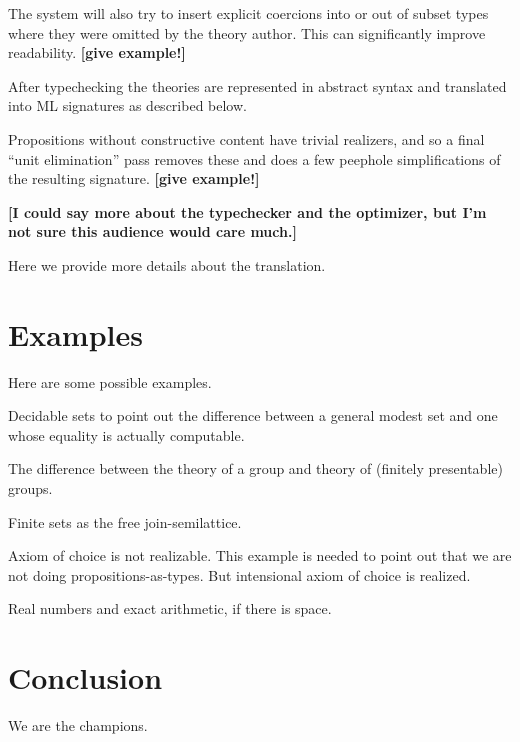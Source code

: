 \documentclass{article}
\newcommand{\comment}[1]{\textbf{[#1]}}
\begin{document}
The system will also try to insert explicit coercions into or out of
subset types where they were omitted by the theory author.  This can
significantly improve readability.  \comment{give example!}

After typechecking the theories are represented in abstract syntax and
translated into ML signatures as described below.  

Propositions without constructive content have trivial realizers, and
so a final ``unit elimination'' pass removes these and does a few
peephole simplifications of the resulting signature. \comment{give example!}

\comment{I could say more about the typechecker and the optimizer, but
  I'm not sure this audience would care much.}

Here we provide more details about the translation.


\section{Examples}
\label{sec:examples}

Here are some possible examples.

Decidable sets to point out the difference between a general modest
set and one whose equality is actually computable.

The difference between the theory of a group and theory of (finitely
presentable) groups.

Finite sets as the free join-semilattice.

Axiom of choice is not realizable. This example is needed to point out
that we are not doing propositions-as-types. But intensional axiom of
choice is realized.

Real numbers and exact arithmetic, if there is space.

\section{Conclusion}
\label{sec:conclusion}

We are the champions.





\end{document}
